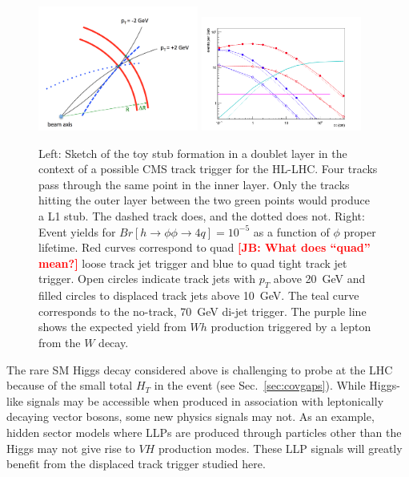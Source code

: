 \begin{figure}[t]\begin{center}
\includegraphics[width=0.47\textwidth]{figures/L1TT/geom.png}
\includegraphics[width=0.47\textwidth]{figures/L1TT/final_h125.png}
\caption{Left: Sketch of the toy stub formation in a doublet layer in the context of a possible CMS track trigger for the HL-LHC. Four tracks pass through the same point in the inner layer. Only the tracks hitting the outer layer between the two green points would produce a L1 stub. The dashed track does, and the dotted does not. Right: Event yields for $Br[h\rightarrow\phi\phi\rightarrow 4q]=10^{-5}$ as a function of $\phi$ proper lifetime. Red curves correspond to quad {\bf \textcolor{red}{[JB: What does ``quad'' mean?]}} loose track jet trigger and blue to quad tight track jet trigger. Open circles indicate track jets with $p_T$ above 20~GeV and filled circles to displaced track jets above 10~GeV. The teal curve corresponds to the no-track, 70~GeV di-jet trigger. The purple line shows the expected yield from $Wh$ production triggered by a lepton from the $W$ decay.}
\label{fig:tracktrigger_toy}
\end{center}
\end{figure}

The rare SM Higgs decay considered above is challenging to probe at the LHC because of the small total $H_T$ in the event (see Sec.~\ref{sec:covgaps}). While Higgs-like signals may be accessible when produced in association with leptonically decaying vector bosons, some new physics signals may not. As an example, hidden sector models where LLPs are produced through particles other than the Higgs may not give rise to $VH$ production modes. These LLP signals will greatly benefit from the displaced track trigger studied here.


